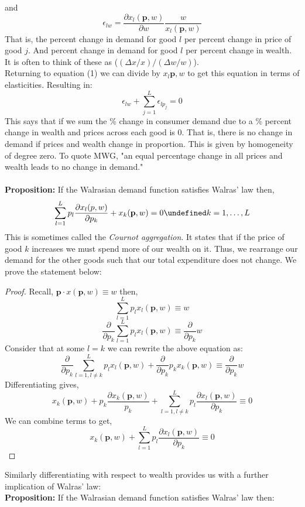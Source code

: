 \documentclass[12pt]{article}
\let\oldforall\forall
\let\forall\undefined
\let\bf\oldbf
\let\bf\textbf
\DeclareMathOperator{\forall}{\,\oldforall\,}
\begin{document}
and
$$\epsilon_{lw} = \frac{\partial x_l(\bf{p}, w)}{\partial w}\frac{w}{x_l(\bf{p}, w)}$$
That is, the percent change in demand for good $l$ per percent change in price of good $j$. And percent change in demand for good $l$ per percent change in wealth. It is often to think of these as ($(\Delta x/x)/(\Delta w/w)$).
\\ Returning to equation (1) we can divide by $x_l{\bf{p}, w}$ to get this equation in terms of elasticities. Resulting in:
\begin{equation}\epsilon_{lw} + \sum^L_{j = 1}\epsilon_{lp_j} = 0\end{equation}
This says that if we sum the \% change in consumer demand due to a \% percent change in wealth and prices across each good is 0. That is, there is no change in demand if prices and wealth change in proportion. This is given by homogeneity of degree zero. To quote MWG, "an equal percentage change in all prices and wealth leads to no change in demand."
\\ \bf{\\Proposition:} If the Walrasian demand function satisfies Walras' law then,
\begin{equation}
\sum^L_{l=1}p_l\frac{\partial x_l(p,w)}{\partial p_k} + x_k(\bf{p}, w) = 0 \forall k = 1,\dots,L
\end{equation}
This is sometimes called the \emph{Cournot aggregation}. It states that if the price of good $k$ increases we must spend more of our wealth on it. Thus, we rearrange our demand for the other goods such that our total expenditure does not change. We prove the statement below:
\begin{proof}
Recall, $\bf{p}\cdot x(\bf{p}, w) \equiv w$ then,
$$\sum^L_{l=1}p_lx_l(\bf{p},w) \equiv w$$
$$\frac{\partial}{\partial p_k}\sum^L_{l=1}p_lx_l(\bf{p},w) \equiv \frac{\partial}{\partial p_k}w$$
Consider that at some $l = k$ we can rewrite the above equation as:
$$\frac{\partial}{\partial p_k}\sum^L_{l=1, l\not=k}p_lx_l(\bf{p},w) + \frac{\partial}{\partial p_k}p_kx_k(\bf{p},w)\equiv \frac{\partial}{\partial p_k}w$$
Differentiating gives,
$$x_k(\bf{p}, w) + p_k\frac{\partial x_k(\bf{p}, w)}{p_k} + \sum^L_{l=1, l\not= k}p_l\frac{\partial x_l(\bf{p},w)}{\partial p_k} \equiv 0$$
We can combine terms to get,
$$x_k(\bf{p}, w) + \sum^L_{l=1}p_l\frac{\partial x_l(\bf{p},w)}{\partial p_k} \equiv 0$$
\end{proof}
Similarly differentiating with respect to wealth provides us with a further implication of Walras' law:
\\ \bf{Proposition:} If the Walrasian demand function satisfies Walras' law then: 
\end{document}
